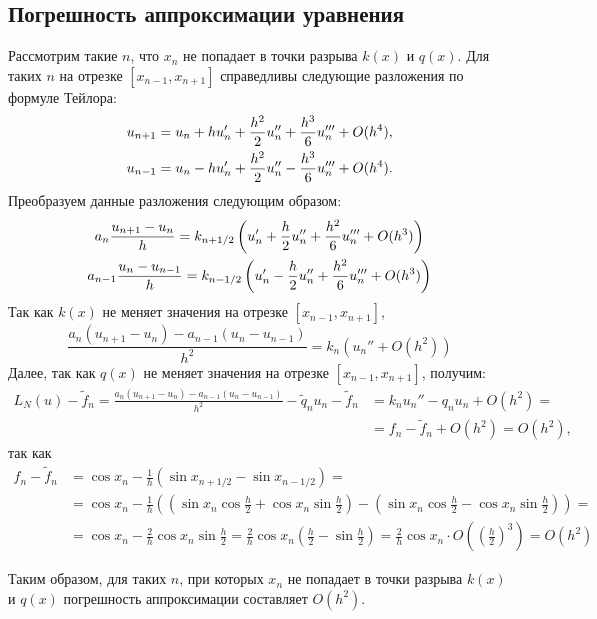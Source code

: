 \documentclass[titlepage]{article}
\def\l{\left}
\def\r{\right}
\begin{document}
\subsection{Погрешность аппроксимации уравнения}
Рассмотрим такие $n$, что $x_n$ не попадает в точки разрыва $k(x)$ и $q(x)$. Для таких $n$ на отрезке $[x_{n-1}, x_{n+1}]$ справедливы следующие разложения по формуле Тейлора:
\begin{gather}
	\notag u_{n+1} = u_n + hu_n' + \frac{h^2}{2}u_n'' + \frac{h^3}{6}u_n''' + O(h^4), \\
	\notag u_{n-1} = u_n - hu_n' + \frac{h^2}{2}u_n'' - \frac{h^3}{6}u_n''' + O(h^4).
\end{gather}
Преобразуем данные разложения следующим образом:
\begin{gather}
	\notag a_n\frac{u_{n+1} - u_n}{h} = k_{n+1/2} \l(u_n' + \frac{h}{2}u_n'' + \frac{h^2}{6}u_n''' + O(h^3) \r) \\
	\notag a_{n-1}\frac{u_n - u_{n-1}}{h} = k_{n-1/2} \l(u_n' - \frac{h}{2}u_n'' + \frac{h^2}{6}u_n''' + O(h^3) \r)
\end{gather}
Так как $k(x)$ не меняет значения на отрезке $[x_{n-1}, x_{n+1}]$,
$$\frac{a_n(u_{n+1}-u_n) - a_{n-1}(u_n - u_{n-1})}{h^2} = k_n(u_n'' + O(h^2))$$
Далее, так как $q(x)$ не меняет значения на отрезке $[x_{n-1}, x_{n+1}]$, получим:
\begin{align*}
	L_{N}(u) - \tilde f_n = \frac{a_n(u_{n+1}-u_n) - a_{n-1}(u_n - u_{n-1})}{h^2} - \tilde q_n u_n - \tilde f_n &= k_n u_n'' - q_n u_n + O(h^2) = \\
	& = f_n - \tilde f_n + O(h^2) = O(h^2),
\end{align*}
так как
\begin{align*}
	f_n - \tilde f_n &= \cos{x_n} - \frac{1}{h}(\sin{x_{n+1/2}} - \sin{x_{n-1/2}}) = \\
	&= \cos{x_n} - \frac{1}{h}\l(\l(\sin{x_n}\cos{\frac{h}{2}} + \cos{x_n}\sin{\frac{h}{2}}\r) - \l(\sin{x_n}\cos{\frac{h}{2}} - \cos{x_n}\sin{\frac{h}{2}}\r)\r) = \\
	&= \cos{x_n} - \frac{2}{h}\cos{x_n}\sin{\frac{h}{2}} = \frac{2}{h}\cos{x_n}\l(\frac{h}{2} - \sin{\frac{h}{2}}\r) = \frac{2}{h}\cos{x_n}\cdot O\l(\l(\frac{h}{2}\r)^3\r) = O(h^2)
\end{align*}

Таким образом, для таких $n$, при которых $x_n$ не попадает в точки разрыва $k(x)$ и $q(x)$ погрешность аппроксимации составляет $O(h^2)$.
\end{document}
